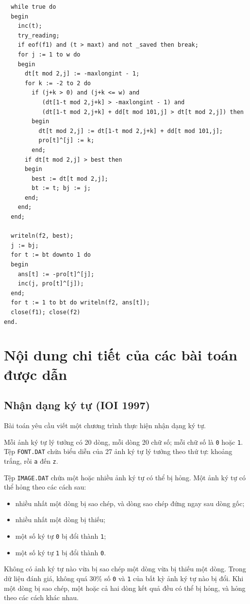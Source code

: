\documentclass[11pt]{article}
\begin{document}
\begin{verbatim}
  while true do
  begin
    inc(t);
    try_reading;
    if eof(f1) and (t > maxt) and not _saved then break;
    for j := 1 to w do
    begin
      dt[t mod 2,j] := -maxlongint - 1;
      for k := -2 to 2 do
        if (j+k > 0) and (j+k <= w) and
           (dt[1-t mod 2,j+k] > -maxlongint - 1) and
           (dt[1-t mod 2,j+k] + dd[t mod 101,j] > dt[t mod 2,j]) then
        begin
          dt[t mod 2,j] := dt[1-t mod 2,j+k] + dd[t mod 101,j];
          pro[t]^[j] := k;
        end;
      if dt[t mod 2,j] > best then
      begin
        best := dt[t mod 2,j];
        bt := t; bj := j;
      end;
    end;
  end;

  writeln(f2, best);
  j := bj;
  for t := bt downto 1 do
  begin
    ans[t] := -pro[t]^[j];
    inc(j, pro[t]^[j]);
  end;
  for t := 1 to bt do writeln(f2, ans[t]);
  close(f1); close(f2)
end.
\end{verbatim}

\section{Nội dung chi tiết của các bài toán được dẫn}

\subsection{Nhận dạng ký tự (IOI 1997)}

Bài toán yêu cầu viết một chương trình thực hiện nhận dạng ký tự.

Mỗi ảnh ký tự lý tưởng có 20 dòng, mỗi dòng 20 chữ số; mỗi chữ số là
\texttt{0} hoặc \texttt{1}. Tệp \texttt{FONT.DAT} chứa biểu diễn của 27 ảnh
ký tự lý tưởng theo thứ tự: khoảng trắng, rồi \texttt{a} đến \texttt{z}.

Tệp \texttt{IMAGE.DAT} chứa một hoặc nhiều ảnh ký tự có thể bị hỏng. Một ảnh
ký tự có thể hỏng theo các cách sau:
\begin{itemize}
  \item nhiều nhất một dòng bị sao chép, và dòng sao chép đứng ngay sau dòng
  gốc;
  \item nhiều nhất một dòng bị thiếu;
  \item một số ký tự \texttt{0} bị đổi thành \texttt{1};
  \item một số ký tự \texttt{1} bị đổi thành \texttt{0}.
\end{itemize}
Không có ảnh ký tự nào vừa bị sao chép một dòng vừa bị thiếu một dòng. Trong
dữ liệu đánh giá, không quá 30\% số \texttt{0} và \texttt{1} của bất kỳ ảnh
ký tự nào bị đổi. Khi một dòng bị sao chép, một hoặc cả hai dòng kết quả đều
có thể bị hỏng, và hỏng theo các cách khác nhau.
\end{document}
